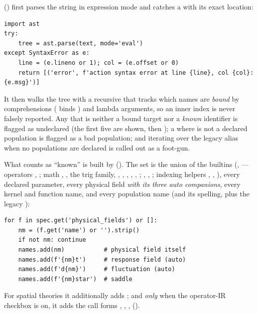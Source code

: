 () first parses the string in expression mode and
catches a  with its exact location:

\begin{lstlisting}
import ast
try:
    tree = ast.parse(text, mode='eval')
except SyntaxError as e:
    line = (e.lineno or 1); col = (e.offset or 0)
    return [('error', f'action syntax error at line {line}, col {col}: {e.msg}')]
\end{lstlisting}

It then walks the tree with a recursive  that tracks which
names are \emph{bound} by comprehensions ( binds ) and
lambda arguments, so an inner index is never falsely reported. Any 
that is neither a bound target nor a \emph{known} identifier is flagged as
undeclared (the first five are shown, then ); a 
where  is not a declared population is flagged as a bad population; and
iterating over the legacy alias  when no populations are declared is
called out as a foot-gun.

What counts as ``known'' is built by 
(). The set is the union of the builtins
(,  --- operators
, ; math , , the trig family, ,
, , , , ; ,
, ; indexing helpers , ,
), every declared parameter, every physical field \emph{with its three
auto companions}, every kernel and function name, and every population name (and
its  spelling, plus the legacy ):

\begin{lstlisting}
for f in spec.get('physical_fields') or []:
    nm = (f.get('name') or '').strip()
    if not nm: continue
    names.add(nm)           # physical field itself
    names.add(f'{nm}t')     # response field (auto)
    names.add(f'd{nm}')     # fluctuation (auto)
    names.add(f'{nm}star')  # saddle
\end{lstlisting}

For spatial theories it additionally adds ; and \emph{only} when
the operator-IR checkbox is on, it adds the call forms , ,
,  ().


